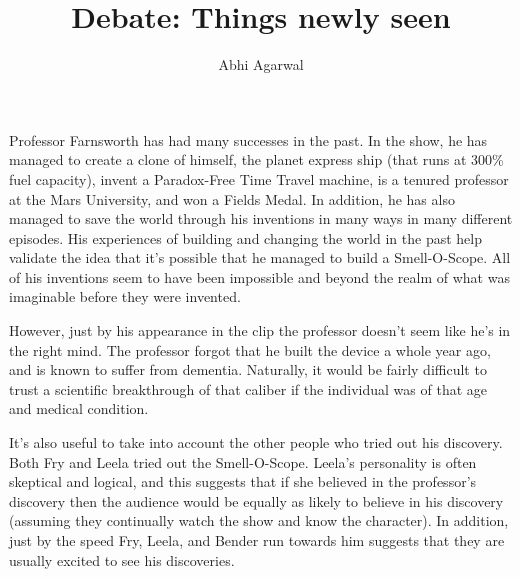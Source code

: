 \documentclass[11pt, oneside]{article}
\title{Debate: Things newly seen}
\author{Abhi Agarwal}
\date{}
\begin{document}
\maketitle





\par Professor Farnsworth has had many successes in the past. In the show, he has managed to create a clone of himself, the planet express ship (that runs at 300\% fuel capacity), invent a Paradox-Free Time Travel machine, is a tenured professor at the Mars University, and won a Fields Medal. In addition, he has also managed to save the world through his inventions in many ways in many different episodes. His experiences of building and changing the world in the past help validate the idea that it's possible that he managed to build a Smell-O-Scope. All of his inventions seem to have been impossible and beyond the realm of what was imaginable before they were invented. 

\par However, just by his appearance in the clip the professor doesn't seem like he's in the right mind. The professor forgot that he built the device a whole year ago, and is known to suffer from dementia. Naturally, it would be fairly difficult to trust a scientific breakthrough of that caliber if the individual was of that age and medical condition. 


\par It's also useful to take into account the other people who tried out his discovery. Both Fry and Leela tried out the Smell-O-Scope. Leela's personality is often skeptical and logical, and this suggests that if she believed in the professor's discovery then the audience would be equally as likely to believe in his discovery (assuming they continually watch the show and know the character). In addition, just by the speed Fry, Leela, and Bender run towards him suggests that they are usually excited to see his discoveries.
\end{document}
